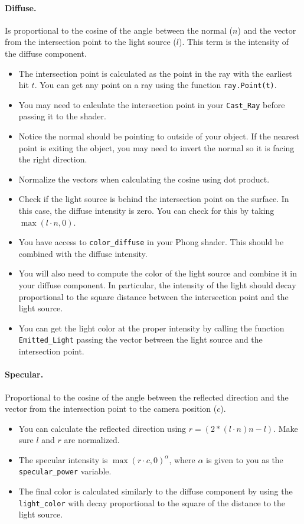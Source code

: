 \documentclass[12pt]{article}
\begin{document}
\paragraph*{Diffuse.} Is proportional to the cosine of the angle between the
normal ($n$) and the vector from the intersection point to the light source
($l$). This term is the intensity of the diffuse component.
\begin{itemize}
\item The intersection point is calculated as the point in the ray with the
  earliest hit $t$. You can get any point on a ray using the function
  \texttt{ray.Point(t)}.
\item You may need to calculate the intersection point in your
  \texttt{Cast\_Ray} before passing it to the shader.
\item Notice the normal should be pointing to outside of your object. If the
  nearest point is exiting the object, you may need to invert the normal so it
  is facing the right direction.
\item Normalize the vectors when calculating the cosine using dot product.
\item Check if the light source is behind the intersection point on the
  surface. In this case, the diffuse intensity is zero. You can check for this
  by taking $\max(l \cdot n, 0)$.
\item You have access to \texttt{color\_diffuse} in your Phong shader. This
  should be combined with the diffuse intensity.
\item You will also need to compute the color of the light source and combine it
  in your diffuse component. In particular, the intensity of the light should
  decay proportional to the square distance between the intersection point and
  the light source.
\item You can get the light color at the proper intensity by calling the function
  \texttt{Emitted\_Light} passing the vector between the light source and the intersection point.
\end{itemize}

\paragraph*{Specular.} Proportional to the cosine of the angle between the
reflected direction and the vector from the intersection point to the camera
position ($c$).
\begin{itemize}
\item You can calculate the reflected direction using $r=(2*(l \cdot n)
  n-l)$. Make sure $l$ and $r$ are normalized.
\item The specular intensity is $\max(r \cdot c,0)^\alpha$, where $\alpha$ is
  given to you as the \texttt{specular\_power} variable.
\item The final color is calculated similarly to the diffuse component by using
  the \texttt{light\_color} with decay proportional to the square of the
  distance to the light source.
\end{itemize}
\end{document}
